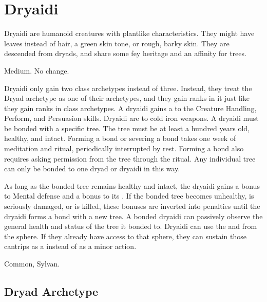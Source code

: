 \section{Dryaidi}

  Dryaidi are humanoid creatures with plantlike characteristics.
  They might have leaves instead of hair, a green skin tone, or rough, barky skin.
  They are descended from dryads, and share some fey heritage and an affinity for trees.

   Medium.
   No change.
  \begin{raggeditemize}
     Dryaidi only gain two class archetypes instead of three.
      Instead, they treat the Dryad archetype as one of their archetypes, and they gain ranks in it just like they gain ranks in class archetypes.
     A dryaidi gains a   to the Creature Handling, Perform, and Persuasion skills.
     Dryaidi are \vulnerable to cold iron weapons.
     A dryaidi must be bonded with a specific tree.
      The tree must be at least a hundred years old, healthy, and intact.
      Forming a bond or severing a bond takes one week of meditation and ritual, periodically interrupted by rest.
      Forming a bond also requires asking permission from the tree through the ritual.
      Any individual tree can only be bonded to one dryad or dryaidi in this way.

      As long as the bonded tree remains healthy and intact, the dryaidi gains a  bonus to Mental defense and a  bonus to its .
      If the bonded tree becomes unhealthy, is seriously damaged, or is killed, these bonuses are inverted into penalties until the dryaidi forms a bond with a new tree.
      A bonded dryaidi can passively observe the general health and status of the tree it bonded to.
     Dryaidi can use the  and   from the  sphere.
      If they already have access to that sphere, they can sustain those cantrips as a  instead of as a minor action.
  \end{raggeditemize}
   Common, Sylvan.

  \subsection{Dryad Archetype}

